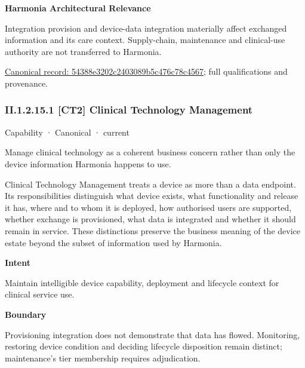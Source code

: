 \textbf{Harmonia Architectural Relevance}



Integration provision and device-data integration materially affect exchanged information and its care context. Supply-chain, maintenance and clinical-use authority are not transferred to Harmonia.


{\footnotesize \href{../../../../continuum/strategy/capability/54388e3202c2403089b5c476c78c4567.md}{Canonical record: 54388e3202c2403089b5c476c78c4567}; full qualifications and provenance.}\par
\subsubsection*{II.1.2.15.1 [CT2] Clinical Technology Management}
\label{navigation:II.1.2.15.1}

\label{element:6c91476a45eb4432b1f90b47a4c2ad35}
{\small Capability · Canonical · current}\par

Manage clinical technology as a coherent business concern rather than only the device information Harmonia happens to use.



Clinical Technology Management treats a device as more than a data endpoint. Its responsibilities distinguish what device exists, what functionality and release it has, where and to whom it is deployed, how authorised users are supported, whether exchange is provisioned, what data is integrated and whether it should remain in service. These distinctions preserve the business meaning of the device estate beyond the subset of information used by Harmonia.



\textbf{Intent}



Maintain intelligible device capability, deployment and lifecycle context for clinical service use.



\textbf{Boundary}



Provisioning integration does not demonstrate that data has flowed. Monitoring, restoring device condition and deciding lifecycle disposition remain distinct; maintenance's tier membership requires adjudication.


